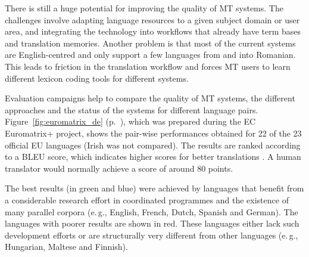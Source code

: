 \documentclass[]{../../metanetpaper}
\begin{document}
\begin{multicols}{2}
There is still a huge potential for improving the quality of MT systems. The challenges involve adapting language resources to a given subject domain or user area, and integrating the technology into workflows that already have term bases and translation memories. Another problem is that most of the current systems are English-centred and only support a few languages from and into Romanian. This leads to friction in the translation workflow and forces MT users to learn different lexicon coding tools for different systems.

Evaluation campaigns help to compare the quality of MT systems, the different approaches and the status of the systems for different language pairs. Figure~\ref{fig:euromatrix_de} (p.~\pageref{fig:euromatrix_de}), which was prepared during the EC Euromatrix+ project, shows the pair-wise performances obtained for 22 of the 23 official EU languages (Irish was not compared). The results are ranked according to a BLEU score, which indicates higher scores for better translations \cite{bleu1}. A human translator would normally achieve a score of around 80 points.

The best results (in green and blue) were achieved by languages that benefit from a considerable research effort in coordinated programmes and the existence of many parallel corpora (e.\,g., English, French, Dutch, Spanish and German). The languages with poorer results are shown in red. These languages either lack such development efforts or are structurally very different from other languages (e.\,g., Hungarian, Maltese and Finnish).


\end{multicols}
\end{document}
